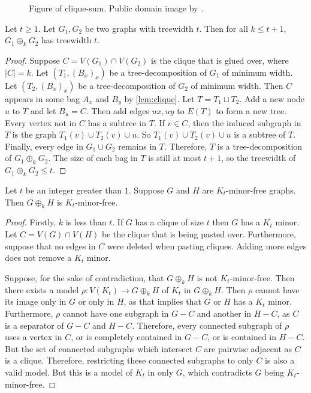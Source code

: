 \begin{figure}[h]
	\centering
	
	\caption[Clique-sum]{Figure of clique-sum. Public domain image by \textcite{eppsteinCliquesum2023}.}\label{fig:clique-sum}
\end{figure}


\begin{proposition}\label{prop:cliquesum_treewidth}
	Let $t \geq 1$. Let $G_1, G_2$ be two graphs with treewidth $t$. Then for all $k \leq t + 1$, $G_1 \oplus_k G_2$ has treewidth $t$. 
\end{proposition}
\begin{proof}
	Suppose $C = V(G_1) \cap V(G_2)$ is the clique that is glued over, where $|C| = k$. Let $(T_1, (B_x)_x)$ be a tree-decomposition of $G_1$ of minimum width. Let $(T_2, (B_x)_x)$ be a tree-decomposition of $G_2$ of minimum width. Then $C$ appears in some bag $A_x$ and $B_y$ by \cref{lem:clique}. Let $T = T_1 \sqcup T_2$. Add a new node $u$ to $T$ and let $B_u = C$. Then add edges $ux, uy$ to $E(T)$ to form a new tree. Every vertex not in $C$ has a subtree in $T$. If $v \in C$, then the induced subgraph in $T$ is the graph $T_1(v) \cup T_2(v) \cup u$. So $T_1(v) \cup T_2(v) \cup u$ is a subtree of $T$. Finally, every edge in $G_1 \cup G_2$ remains in $T$. Therefore, $T$ is a tree-decomposition of $G_1 \oplus_k G_2$. The size of each bag in $T$ is still at most $t + 1$, so the treewidth of $G_1 \oplus_k G_2 \leq t$.
\end{proof}

\begin{proposition}\label{prop:cliquesum_minor}
	Let $t$ be an integer greater than $1$. Suppose $G$ and $H$ are $K_t$-minor-free graphs. Then $G \oplus_k H$ is $K_{t}$-minor-free. 
\end{proposition}
\begin{proof}
	Firstly, $k$ is less than $t$. If $G$ has a clique of size $t$ then $G$ has a $K_t$ minor. Let $C = V(G) \cap V(H)$ be the clique that is being pasted over. Furthermore, suppose that no edges in $C$ were deleted when pasting cliques. Adding more edges does not remove a $K_t$ minor. 

	Suppose, for the sake of contradiction, that $G \oplus_k H$ is not $K_t$-minor-free. Then there exists a model $\rho: V(K_t) \rightarrow G\oplus_k H$ of $K_t$ in $G \oplus_k H$. Then $\rho$ cannot have its image only in $G$ or only in $H$, as that implies that $G$ or $H$ has a $K_t$ minor. Furthermore, $\rho$ cannot have one subgraph in $G - C$ and another in $H - C$, as $C$ is a separator of $G - C$ and $H - C$.
	Therefore, every connected subgraph of $\rho$ uses a vertex in $C$, or is completely contained in $G - C$, or is contained in $H - C$. But the set of connected subgraphs which intersect $C$ are pairwise adjacent as $C$ is a clique. Therefore, restricting these connected subgraphs to only $C$ is also a valid model. But this is a model of $K_t$ in only $G$, which contradicts $G$ being $K_t$-minor-free. 
\end{proof}
